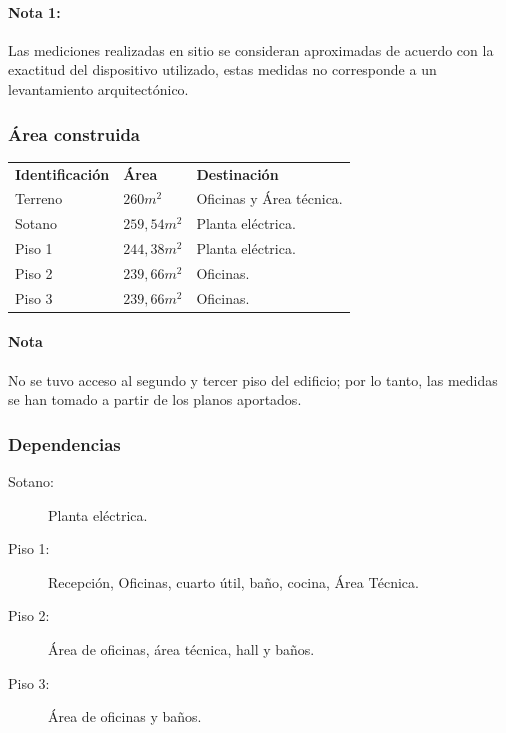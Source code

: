 \documentclass[12pt,a4paper,twoside]{article}
\begin{document}
{\paragraph{Nota 1:} Las mediciones realizadas en sitio se consideran aproximadas de acuerdo con la exactitud del dispositivo utilizado, estas medidas no corresponde a un levantamiento arquitectónico.
%
\subsubsection{Área construida}
%
\begin{center}
%	
	\begin{tabular}{ ||l| |l| |l|| }
%		
	\textbf{Identificación} & \textbf{Área} & \textbf{Destinación} \\
		Terreno & $260 m^{2}$ & Oficinas y Área técnica. \\
		Sotano & $259,54 m^{2}$ & Planta eléctrica.  \\
		Piso 1 & $244,38 m^{2}$ & Planta eléctrica.  \\
		Piso 2 & $239,66 m^{2}$ & Oficinas.  \\
		Piso 3 & $239,66 m^{2}$ & Oficinas.  \\
	\end{tabular}
\end{center}
%
\paragraph{Nota} 
No se tuvo acceso al segundo y tercer piso del edificio; por lo tanto, las medidas se han tomado a partir de los planos aportados. 
%
\subsubsection{Dependencias}
%
\begin{description}
%
\item[Sotano:] Planta eléctrica.	
\item[Piso 1:] Recepción, Oficinas, cuarto útil, baño, cocina, Área Técnica. 
\item[Piso 2:] Área de oficinas, área técnica, hall y baños.
\item[Piso 3:] Área de oficinas y baños.
%
\end{description}
%
}
\end{document}
